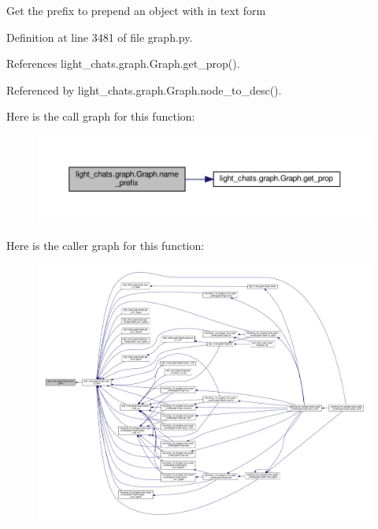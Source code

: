 \begin{DoxyVerb}Get the prefix to prepend an object with in text form\end{DoxyVerb}
 

Definition at line 3481 of file graph.\+py.



References light\+\_\+chats.\+graph.\+Graph.\+get\+\_\+prop().



Referenced by light\+\_\+chats.\+graph.\+Graph.\+node\+\_\+to\+\_\+desc().

Here is the call graph for this function\+:
\nopagebreak
\begin{figure}[H]
\begin{center}
\leavevmode
\includegraphics[width=350pt]{classlight__chats_1_1graph_1_1Graph_a2da14e9a8a4c547fea59eee63dd9f70c_cgraph}
\end{center}
\end{figure}
Here is the caller graph for this function\+:
\nopagebreak
\begin{figure}[H]
\begin{center}
\leavevmode
\includegraphics[width=350pt]{classlight__chats_1_1graph_1_1Graph_a2da14e9a8a4c547fea59eee63dd9f70c_icgraph}
\end{center}
\end{figure}
\mbox{\label{classlight__chats_1_1graph_1_1Graph_ad9d86fc2b41fef8960a90b517d80cd81}} 
